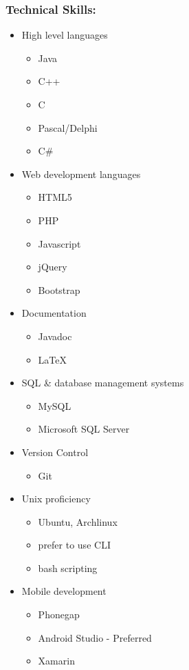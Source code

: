 \documentclass{article}
\begin{document}
	\subsubsection{Technical Skills:}
	\begin{itemize}
		\item High level languages
			\begin{itemize}
				\item Java
				\item C++
				\item C
				\item Pascal/Delphi
				\item C\#
			\end{itemize}
		\item Web development languages
			\begin{itemize}
				\item HTML5
				\item PHP
				\item Javascript
				\item jQuery
				\item Bootstrap
			\end{itemize}
		\item Documentation
			\begin{itemize}
				\item Javadoc
				\item LaTeX
			\end{itemize}
		\item SQL \& database management systems
			\begin{itemize}
				\item MySQL
				\item Microsoft SQL Server
			\end{itemize}
		\item Version Control
			\begin{itemize}
				\item Git
			\end{itemize}
		\item Unix proficiency
			\begin{itemize}
				\item Ubuntu, Archlinux
				\item prefer to use CLI
				\item bash scripting
			\end{itemize}
		\item Mobile development
			\begin{itemize}
				\item Phonegap
				\item Android Studio - Preferred
				\item Xamarin
			\end{itemize}
	\end{itemize}
\end{document}
